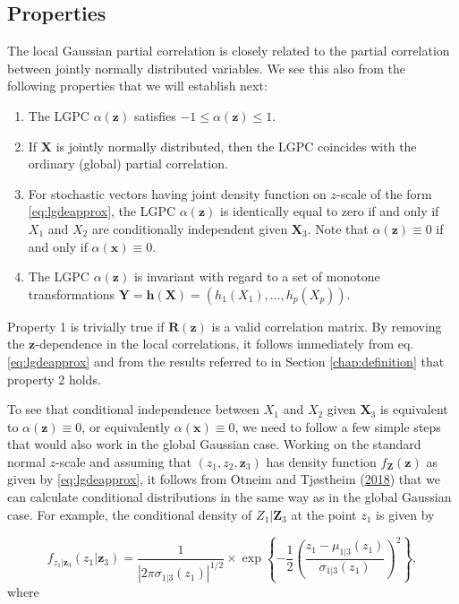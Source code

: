 \documentclass[
  12pt,
  letterpaper]{article}
\providecommand{\tightlist}{%
  \setlength{\itemsep}{0pt}\setlength{\parskip}{0pt}}
\newcommand{\X}{\bm{X}}
\newcommand{\x}{\bm{x}}
\newcommand{\Z}{\bm{Z}}
\newcommand{\z}{\bm{z}}
\newcommand{\Y}{\bm{Y}}
\newcommand{\R}{\bm{R}}
\theoremstyle{definition}
\theoremstyle{definition}
\theoremstyle{definition}
\theoremstyle{remark}
\begin{document}
\hypertarget{properties}{%
\subsection{Properties}\label{properties}}

The local Gaussian partial correlation is closely related to the partial correlation between jointly normally distributed variables. We see this also from the following properties that we will establish next:

\begin{enumerate}
\def\labelenumi{\arabic{enumi}.}
\tightlist
\item
  The LGPC \(\alpha(\z)\) satisfies \(-1 \leq \alpha(\z) \leq 1\).
\item
  If \(\X\) is jointly normally distributed, then the LGPC coincides with the ordinary (global) partial correlation.
\item
  For stochastic vectors having joint density function on \(z\)-scale of the form \eqref{eq:lgdeapprox}, the LGPC \(\alpha(\z)\) is identically equal to zero if and only if \(X_1\) and \(X_2\) are conditionally independent given \(\X_3\). Note that \(\alpha(\z) \equiv 0\) if and only if \(\alpha(\x) \equiv 0\). \label{prop:char}
\item
  The LGPC \(\alpha(\z)\) is invariant with regard to a set of monotone transformations \(\Y = \bm{h}(\X) = (h_1(X_1), \ldots, h_p(X_p))\).
\end{enumerate}

Property 1 is trivially true if \(\R(\z)\) is a valid correlation matrix. By removing the \(\z\)-dependence in the local correlations, it follows immediately from eq. \eqref{eq:lgdeapprox} and from the results referred to in Section \ref{chap:definition} that property 2 holds.

To see that conditional independence between \(X_1\) and \(X_2\) given \(\X_3\) is equivalent to \(\alpha(\z) \equiv 0\), or equivalently \(\alpha(\x) \equiv 0\), we need to follow a few simple steps that would also work in the global Gaussian case. Working on the standard normal \(z\)-scale and assuming that \((z_1, z_2, \z_3)\) has density function \(f_{\Z}(\z)\) as given by \eqref{eq:lgdeapprox}, it follows from Otneim and Tjøstheim (\protect\hyperlink{ref-otneim2017conditional}{2018}) that we can calculate conditional distributions in the same way as in the global Gaussian case. For example, the conditional density of \(Z_1|\Z_3\) at the point \(z_1\) is given by

\[f_{z_1|\z_3}(z_1|\z_3) = \frac{1}{|2\pi\sigma_{1|3}(z_1)|^{1/2}}\times\exp \left\{-\frac{1}{2}\left(\frac{z_1 - \mu_{1|3}(z_1)}{\sigma_{1|3}(z_1)}\right)^2\right\},\]
where
\end{document}
